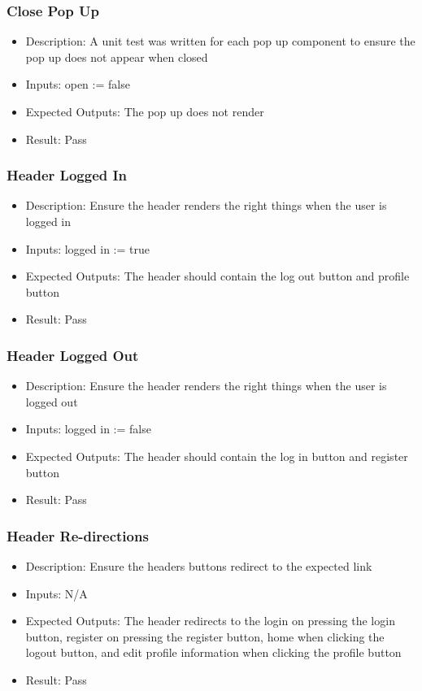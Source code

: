 \documentclass[12pt, titlepage]{article}
\begin{document}
\subsubsection{Close Pop Up}
\begin{itemize}
    \item Description: A unit test was written for each pop up component to ensure the pop up does not appear when closed
    \item Inputs: open := false
    \item Expected Outputs: The pop up does not render 
    \item Result: Pass
\end{itemize}
\subsubsection{Header Logged In}
\begin{itemize}
    \item Description: Ensure the header renders the right things when the user is logged in
    \item Inputs: logged in := true
    \item Expected Outputs: The header should contain the log out button and profile button
    \item Result: Pass
\end{itemize}
\subsubsection{Header Logged Out}
\begin{itemize}
    \item Description: Ensure the header renders the right things when the user is logged out
    \item Inputs: logged in := false
    \item Expected Outputs: The header should contain the log in button and register button
    \item Result: Pass
\end{itemize}
\subsubsection{Header Re-directions}
\begin{itemize}
    \item Description: Ensure the headers buttons redirect to the expected link
    \item Inputs: N/A
    \item Expected Outputs: The header redirects to the login on pressing the login button, register on pressing the register button, home when clicking the logout button, and edit profile information when clicking the profile button 
    \item Result: Pass
\end{itemize}
\end{document}
